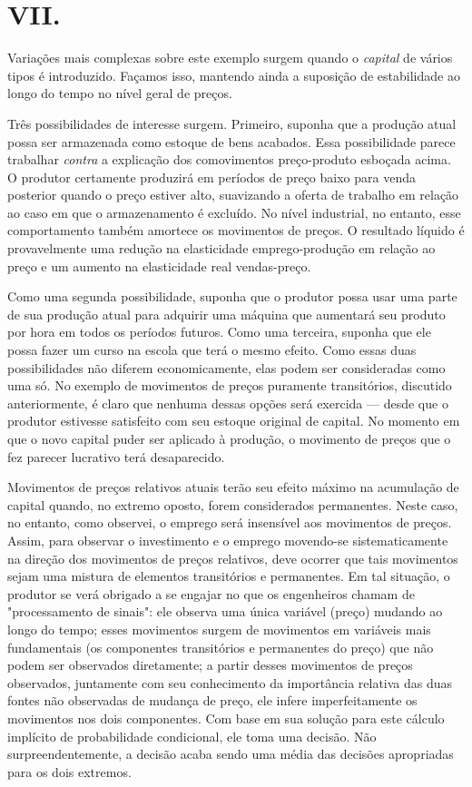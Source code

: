 \documentclass[12pt]{article}
\begin{document}
\section*{VII.}

Variações mais complexas sobre este exemplo surgem quando o \textit{capital} de vários tipos é introduzido. Façamos isso, mantendo ainda a suposição de estabilidade ao longo do tempo no nível geral de preços.

Três possibilidades de interesse surgem. Primeiro, suponha que a produção atual possa ser armazenada como estoque de bens acabados. Essa possibilidade parece trabalhar \textit{contra} a explicação dos comovimentos preço-produto esboçada acima. O produtor certamente produzirá em períodos de preço baixo para venda posterior quando o preço estiver alto, suavizando a oferta de trabalho em relação ao caso em que o armazenamento é excluído. No nível industrial, no entanto, esse comportamento também amortece os movimentos de preços. O resultado líquido é provavelmente uma redução na elasticidade emprego-produção em relação ao preço e um aumento na elasticidade real vendas-preço.

Como uma segunda possibilidade, suponha que o produtor possa usar uma parte de sua produção atual para adquirir uma máquina que aumentará seu produto por hora em todos os períodos futuros. Como uma terceira, suponha que ele possa fazer um curso na escola que terá o mesmo efeito. Como essas duas possibilidades não diferem economicamente, elas podem ser consideradas como uma só. No exemplo de movimentos de preços puramente transitórios, discutido anteriormente, é claro que nenhuma dessas opções será exercida — desde que o produtor estivesse satisfeito com seu estoque original de capital. No momento em que o novo capital puder ser aplicado à produção, o movimento de preços que o fez parecer lucrativo terá desaparecido.

Movimentos de preços relativos atuais terão seu efeito máximo na acumulação de capital quando, no extremo oposto, forem considerados permanentes. Neste caso, no entanto, como observei, o emprego será insensível aos movimentos de preços. Assim, para observar o investimento e o emprego movendo-se sistematicamente na direção dos movimentos de preços relativos, deve ocorrer que tais movimentos sejam uma mistura de elementos transitórios e permanentes. Em tal situação, o produtor se verá obrigado a se engajar no que os engenheiros chamam de "processamento de sinais": ele observa uma única variável (preço) mudando ao longo do tempo; esses movimentos surgem de movimentos em variáveis mais fundamentais (os componentes transitórios e permanentes do preço) que não podem ser observados diretamente; a partir desses movimentos de preços observados, juntamente com seu conhecimento da importância relativa das duas fontes não observadas de mudança de preço, ele infere imperfeitamente os movimentos nos dois componentes. Com base em sua solução para este cálculo implícito de probabilidade condicional, ele toma uma decisão. Não surpreendentemente, a decisão acaba sendo uma média das decisões apropriadas para os dois extremos.
\end{document}
